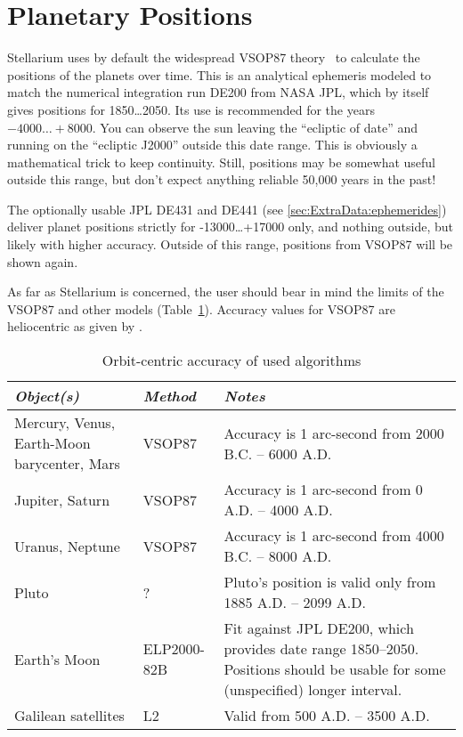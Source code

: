 \section{Planetary Positions}
\label{sec:Accuracy:Planets}

Stellarium uses by default the widespread VSOP87 theory~\citep{1988A&A...202..309B} %
to calculate the positions of the planets over time.
This is an analytical ephemeris modeled to match the numerical
integration run DE200 from NASA JPL, which by itself gives positions for 1850\ldots2050. 
Its use is recommended for the years $-4000\ldots+8000$. You can observe the sun leaving the ``ecliptic
of date'' and running on the ``ecliptic J2000'' outside this date
range. This is obviously a mathematical trick to keep
continuity. Still, positions may be somewhat useful outside this
range, but don't expect anything reliable 50,000 years in the past! 

The optionally usable JPL DE431 and DE441 (see \ref{sec:ExtraData:ephemerides}) deliver planet positions strictly for
-13000\ldots+17000 only, and nothing outside, but likely with higher accuracy. 
Outside of this range, positions from VSOP87 will be shown again.

As far as Stellarium is concerned, the user should bear in mind the
limits of the VSOP87 and other models (Table~\ref{tab:Accuracy:Planets}).
Accuracy values for VSOP87 are heliocentric as given by \citet{1988A&A...202..309B}.

\begin{table}[tb]
\begin{tabularx}{\textwidth}{X|l|X}
\toprule
\emph{Object(s)} & \emph{Method} & \emph{Notes}\tabularnewline
\midrule
Mercury, Venus, Earth-Moon barycenter, Mars & VSOP87 & Accuracy is 1 arc-second from 2000 B.C. -- 6000 A.D. \\%
Jupiter, Saturn                             & VSOP87 & Accuracy is 1 arc-second from 0 A.D. -- 4000 A.D.    \\%
Uranus, Neptune                             & VSOP87 & Accuracy is 1 arc-second from 4000 B.C. -- 8000 A.D. \\%
Pluto                                       & ?      & Pluto's position is valid only from 1885 A.D. -- 2099 A.D.\\%
Earth's Moon                                & ELP2000-82B & Fit against JPL DE200, which provides date range 1850--2050. 
                                                            Positions should be usable for some (unspecified) longer interval. \\%
Galilean satellites                         & L2     & Valid from 500 A.D. -- 3500 A.D.\\ 
\bottomrule
\end{tabularx}
\caption{Orbit-centric accuracy of used algorithms}
\label{tab:Accuracy:Planets}
\end{table}

